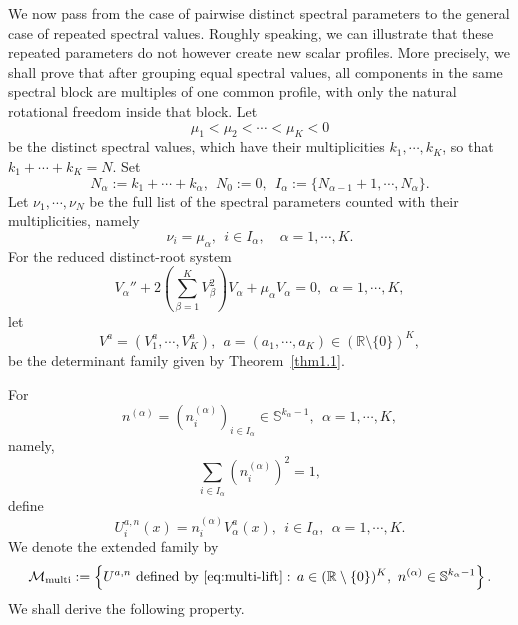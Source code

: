 \documentclass[11pt]{article}
\numberwithin{equation}{section}
\theoremstyle{definition}
\begin{document}
We now pass from the case of pairwise distinct spectral parameters to the general case
of repeated spectral values.
Roughly speaking, we can illustrate that these repeated parameters do not however create new scalar profiles. More precisely, we shall prove that after grouping
equal spectral values, all components in the same spectral block are
multiples of one common profile, with only the natural rotational freedom
inside that block.
Let
\[
\mu_1<\mu_2<\cdots<\mu_K<0
\]
be the distinct spectral values, which have their multiplicities
\(k_1,\cdots,k_K\), so that \(k_1+\cdots+k_K=N\).
Set
\begin{equation}\label{eq:multi-index}
N_\alpha:=k_1+\cdots+k_\alpha,\ \  N_0:=0,
\ \
I_\alpha:=\{N_{\alpha-1}+1,\cdots,N_\alpha\}.
\end{equation}
Let $\nu_1,\cdots,\nu_N$ be the full list of the spectral parameters counted with their
multiplicities, namely
\begin{equation}\label{eq:multi-nu}
\nu_i=\mu_\alpha,
\ \
i\in I_\alpha,\quad \alpha=1,\cdots,K .
\end{equation}
For the reduced distinct-root system
\begin{equation}\label{eq:reduced-system}
V_\alpha''
+2\left(\sum_{\beta=1}^K V_\beta^2\right)V_\alpha
+\mu_\alpha V_\alpha=0,
\ \  \alpha=1,\cdots,K,
\end{equation}
let
\[
V^a=(V_1^a,\cdots,V_K^a),
\ \
a=(a_1,\cdots,a_K)\in(\mathbb R\setminus\{0\})^K,
\]
be the determinant family given by Theorem~\ref{thm1.1}.



For
\[
n^{(\alpha)}
=
(n_i^{(\alpha)})_{i\in I_\alpha}
\in \mathbb S^{k_\alpha-1},
\ \  \alpha=1,\cdots,K,
\]
namely,
\[
\sum_{i\in I_\alpha} (n_i^{(\alpha)})^2=1,
\]
define
\begin{equation}\label{eq:multi-lift}
U_i^{a,n}(x)=n_i^{(\alpha)}V_\alpha^a(x),
\ \
i\in I_\alpha,\ \ \alpha=1,\cdots,K.
\end{equation}
We denote the extended family by
\begin{equation}\label{eq:multi-family}
\mathcal M_{\mathrm{multi}}
:=
\left\{
U^{a,n} \text{ defined by } \eqref{eq:multi-lift}:\,
a\in(\mathbb R\setminus\{0\})^K,\
n^{(\alpha)}\in\mathbb S^{k_\alpha-1}
\right\}.
\end{equation}
We shall derive the following property.
\end{document}
